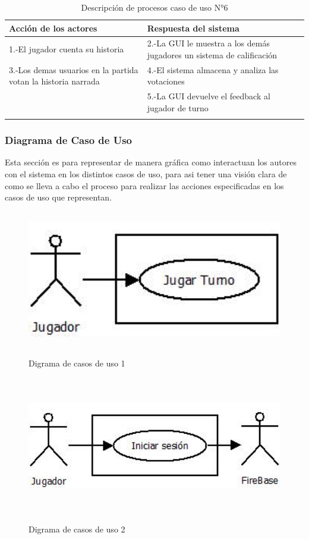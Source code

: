\begin{longtable}[H]{| m{8cm} | m{8cm} |}
\hline 
\textbf{Acción de los actores} & \textbf{Respuesta del sistema}\\
\hline 
1.-El jugador cuenta su historia & 2.-La GUI le muestra a los demás jugadores un sistema de calificación\\
\hline
3.-Los demas usuarios en la partida votan la historia narrada & 4.-El sistema almacena y analiza las votaciones\\
\hline
& 5.-La GUI devuelve el feedback al jugador de turno\\
\hline
\caption{Descripción de procesos caso de uso N°6}
\end{longtable}
\newpage
\subsubsection{Diagrama de Caso de Uso}
Esta sección es para representar de manera gráfica como interactuan los autores con el sistema en los distintos casos de uso, para asi tener una visión clara de como se lleva a cabo el proceso para realizar las acciones especificadas en los casos de uso que representan.\\

\begin{figure}[H]
	\centering
	{\includegraphics[width=12cm, height=6cm]{imgs/DiagramaCasoUso1.png}}
	\caption{Digrama de casos de uso 1}
\end{figure}

\begin{figure}[H]
	\centering
	{\includegraphics[width=12cm, height=6cm]{imgs/DiagramaCasoUso2.png}}
 	\caption{Digrama de casos de uso 2}
\end{figure}

